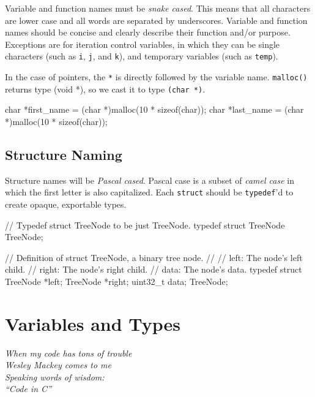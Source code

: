 \documentclass[11pt]{article}
\begin{document}
Variable and function names must be \emph{snake cased}. This means that all
characters are lower case and all words are separated by underscores.  Variable
and function names should be concise and clearly describe their function and/or
purpose. Exceptions are for iteration control variables, in which they can be
single characters (such as \texttt{i}, \texttt{j}, and \texttt{k}), and
temporary variables (such as \texttt{temp}).


In the case of pointers, the \texttt{*} is directly followed by the
variable name. \texttt{malloc()} returns type (void *), so we cast it to
type \texttt{(char *)}.

\begin{clisting}{}
char *first_name = (char *)malloc(10 * sizeof(char));
char *last_name = (char *)malloc(10 * sizeof(char));
\end{clisting}


\subsection{Structure Naming}

Structure names will be \emph{Pascal cased}. Pascal case is a subset of \emph{camel
case} in which the first letter is also capitalized. Each \texttt{struct} should
be \texttt{typedef}'d to create opaque, exportable types.

\begin{clisting}{}
// Typedef struct TreeNode to be just TreeNode.
typedef struct TreeNode TreeNode;

// Definition of struct TreeNode, a binary tree node.
//
// left:   The node's left child.
// right:  The node's right child.
// data:   The node's data.
typedef struct {
    TreeNode *left;
    TreeNode *right;
    uint32_t data;
} TreeNode;
\end{clisting}


\section{Variables and Types}

\textwidth
\epigraph{\emph{When my code has tons of trouble\\ Wesley Mackey comes to me\\
Speaking words of wisdom: \\ ``Code in C''}}{}
\end{document}
